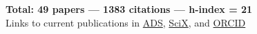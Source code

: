 \documentclass[11pt]{article}
\newcommand{\totalcitations}{{\bf Total: 49 papers --- 1383 citations --- h-index = 21}}
\newcommand{\adspublink}{\href{https://ui.adsabs.harvard.edu/public-libraries/y09ZmJBWTfCs0q5KMVKSwQ}{ADS}}
\newcommand{\scixpublink}{\href{https://scixplorer.org/public-libraries/y09ZmJBWTfCs0q5KMVKSwQ}{SciX}}
\newcommand{\orcidlink}{\href{https://orcid.org/my-orcid?orcid=0000-0003-2508-2586}{ORCID}}
\begin{document}
\totalcitations\\
Links to current publications in \adspublink, \scixpublink, and \orcidlink

\begingroup
\let\clearpage\relax

\renewcommand{\bibsection}{}
{}

\nocite{*}
\endgroup

\end{document}
